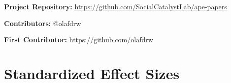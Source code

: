 \documentclass[12pt]{article}
\begin{document}
\noindent\textbf{Project Repository:} \url{https://github.com/SocialCatalystLab/ape-papers}

\noindent\textbf{Contributors:} @olafdrw

\noindent\textbf{First Contributor:} \url{https://github.com/olafdrw}

\label{apep_main_text_end}
\newpage


\newpage
\appendix

\section{Standardized Effect Sizes}
\label{sec:sde}


\end{document}
